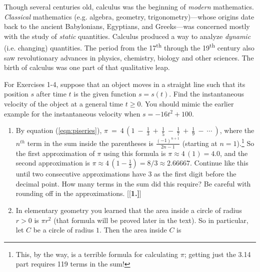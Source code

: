 Though several centuries old, calculus was the beginning of \emph{modern}
mathematics. \emph{Classical} mathematics (e.g. algebra, geometry,
trigonometry)---whose origins date back to the ancient Babylonians, Egyptians,
and Greeks---was concerned mostly with the study of \emph{static} quantities.
Calculus produced a way to analyze \emph{dynamic} (i.e. changing) quantities.
The period from the 17\textsuperscript{th} through the 19\textsuperscript{th}
century also saw revolutionary advances in physics, chemistry, biology and other
sciences. The birth of calculus was one part of that qualitative leap.
\newpage
\startexercises\label{sec1dot1}
{\small
{}
\par\noindent For Exercises 1-4, suppose that an object moves in a straight line
such that its position $s$ after time $t$ is the given function $s=s(t)$. Find
the instantaneous velocity of the object at a general time $t \ge 0$.
You should mimic the earlier example for the instantaneous velocity when
$s = -16t^2 + 100$.
\begin{enumerate}[\bfseries 1.]
 \item By equation (\ref{eqn:piseries}), $\pi ~=~ 4\,\left(1 ~-~ \frac{1}{3} ~+~
  \frac{1}{5} ~-~ \frac{1}{7} ~+~ \frac{1}{9} ~-~ \cdots ~\right)$, where the
  $n^{th}$ term in the sum inside the parentheses is $\frac{(-1)^{n+1}}{2n-1}$
  (starting at $n=1$).\footnote{This, by the way, is a terrible formula
  for calculating $\pi$; getting just the 3.14 part requires 119 terms in the
  sum!} So the first approximation of $\pi$ using this formula is
  $\pi \approx 4\,(1) = 4.0$, and the second approximation is $\pi \approx
  4\,\left(1 - \frac{1}{3}\right) = 8/3 \approx 2.66667$. Continue like this
  until two consecutive approximations have $3$ as the first digit before the
  decimal point. How many terms in the sum did this require? Be careful with
  rounding off in the approximations.
[{[\bfseries 1.]}]
 \item In elementary geometry you learned that the area inside a circle of
  radius $r>0$ is $\pi r^2$ (that formula will be proved later in the text). So
  in particular, let $C$ be a circle of radius $1$. Then the area inside $C$ is

\end{enumerate}}

